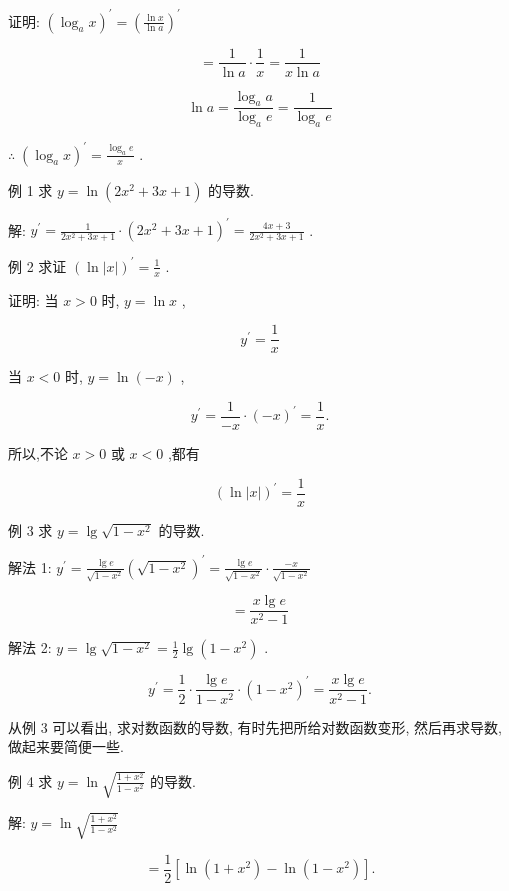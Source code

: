 \documentclass[lang=cn,newtx,10pt,scheme=chinese]{elegantbook}
\begin{document}
证明: \({\left( {\log }_{a}x\right) }^{\prime } = {\left( \frac{\ln x}{\ln a}\right) }^{\prime }\)

\[
= \frac{1}{\ln a} \cdot \frac{1}{x} = \frac{1}{x\ln a}
\]

\[
\ln a = \frac{{\log }_{a}a}{{\log }_{a}e} = \frac{1}{{\log }_{a}e}
\]

\(\therefore \;{\left( {\log }_{a}x\right) }^{\prime } = \frac{{\log }_{a}e}{x}\) .

例 1 求 \(y = \ln \left( {2{x}^{2} + {3x} + 1}\right)\) 的导数.

解: \({y}^{\prime } = \frac{1}{2{x}^{2} + {3x} + 1} \cdot {\left( 2{x}^{2} + 3x + 1\right) }^{\prime } = \frac{{4x} + 3}{2{x}^{2} + {3x} + 1}\) .

例 2 求证 \({\left( \ln \left| x\right| \right) }^{\prime } = \frac{1}{x}\) .

证明: 当 \(x > 0\) 时, \(y = \ln x\) ,

\[
{y}^{\prime } = \frac{1}{x}
\]

当 \(x < 0\) 时, \(y = \ln \left( {-x}\right)\) ,

\[
{y}^{\prime } = \frac{1}{-x} \cdot {\left( -x\right) }^{\prime } = \frac{1}{x}.
\]

所以,不论 \(x > 0\) 或 \(x < 0\) ,都有

\[
{\left( \ln \left| x\right| \right) }^{\prime } = \frac{1}{x}
\]

例 3 求 \(y = \lg \sqrt{1 - {x}^{2}}\) 的导数.

解法 1: \({y}^{\prime } = \frac{\lg e}{\sqrt{1 - {x}^{2}}}{\left( \sqrt{1 - {x}^{2}}\right) }^{\prime } = \frac{\lg e}{\sqrt{1 - {x}^{2}}} \cdot \frac{-x}{\sqrt{1 - {x}^{2}}}\)

\[
= \frac{x\lg e}{{x}^{2} - 1}
\]

解法 2: \(y = \lg \sqrt{1 - {x}^{2}} = \frac{1}{2}\lg \left( {1 - {x}^{2}}\right)\) .

\[
{y}^{\prime } = \frac{1}{2} \cdot \frac{\lg e}{1 - {x}^{2}} \cdot {\left( 1 - {x}^{2}\right) }^{\prime } = \frac{x\lg e}{{x}^{2} - 1}.
\]

从例 3 可以看出, 求对数函数的导数, 有时先把所给对数函数变形, 然后再求导数, 做起来要简便一些.

例 4 求 \(y = \ln \sqrt{\frac{1 + {x}^{2}}{1 - {x}^{2}}}\) 的导数.

解: \(y = \ln \sqrt{\frac{1 + {x}^{2}}{1 - {x}^{2}}}\)

\[
= \frac{1}{2}\left\lbrack {\ln \left( {1 + {x}^{2}}\right) - \ln \left( {1 - {x}^{2}}\right) }\right\rbrack \text{.}
\]
\end{document}
